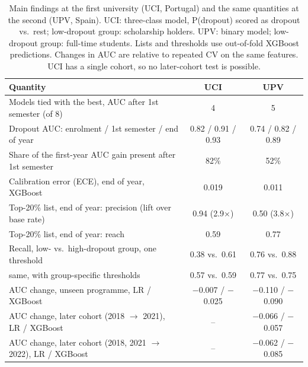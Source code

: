 \begin{table}[H]
\centering
\small
\setlength{\tabcolsep}{4pt}
\caption{Main findings at the first university (UCI, Portugal) and the same quantities at the second (UPV, Spain). UCI: three-class model, P(dropout) scored as dropout vs.\ rest; low-dropout group: scholarship holders. UPV: binary model; low-dropout group: full-time students. Lists and thresholds use out-of-fold XGBoost predictions. Changes in AUC are relative to repeated CV on the same features. UCI has a single cohort, so no later-cohort test is possible.}
\label{tab:replication}
\begin{tabular}{p{7.2cm}cc}
\toprule
Quantity & UCI & UPV \\
\midrule
Models tied with the best, AUC after 1st semester (of 8) & 4 & 5 \\
Dropout AUC: enrolment / 1st semester / end of year & 0.82 / 0.91 / 0.93 & 0.74 / 0.82 / 0.89 \\
Share of the first-year AUC gain present after 1st semester & 82\% & 52\% \\
Calibration error (ECE), end of year, XGBoost & 0.019 & 0.011 \\
Top-20\% list, end of year: precision (lift over base rate) & 0.94 (2.9$\times$) & 0.50 (3.8$\times$) \\
Top-20\% list, end of year: reach & 0.59 & 0.77 \\
Recall, low- vs.\ high-dropout group, one threshold & 0.38 vs.\ 0.61 & 0.76 vs.\ 0.88 \\
\quad same, with group-specific thresholds & 0.57 vs.\ 0.59 & 0.77 vs.\ 0.75 \\
AUC change, unseen programme, LR / XGBoost & $-$0.007 / $-$0.025 & $-$0.110 / $-$0.090 \\
AUC change, later cohort (2018 $\to$ 2021), LR / XGBoost & -- & $-$0.066 / $-$0.057 \\
AUC change, later cohort (2018, 2021 $\to$ 2022), LR / XGBoost & -- & $-$0.062 / $-$0.085 \\
\bottomrule
\end{tabular}
\end{table}
